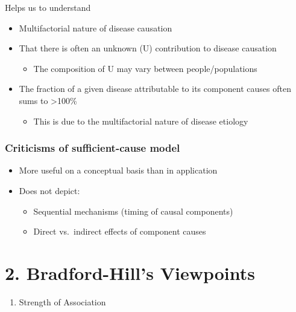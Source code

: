 \documentclass[
]{book}
\providecommand{\tightlist}{%
  \setlength{\itemsep}{0pt}\setlength{\parskip}{0pt}}
\begin{document}
Helps us to understand

\begin{itemize}
\tightlist
\item
  Multifactorial nature of disease causation
\item
  That there is often an unknown (U) contribution to disease causation

  \begin{itemize}
  \tightlist
  \item
    The composition of U may vary between people/populations
  \end{itemize}
\item
  The fraction of a given disease attributable to its component causes often sums to \textgreater100\%

  \begin{itemize}
  \tightlist
  \item
    This is due to the multifactorial nature of disease etiology
  \end{itemize}
\end{itemize}

\hypertarget{criticisms-of-sufficient-cause-model}{%
\subsubsection{Criticisms of sufficient-cause model}\label{criticisms-of-sufficient-cause-model}}

\begin{itemize}
\tightlist
\item
  More useful on a conceptual basis than in application
\item
  Does not depict:

  \begin{itemize}
  \tightlist
  \item
    Sequential mechanisms (timing of causal components)
  \item
    Direct vs.~indirect effects of component causes
  \end{itemize}
\end{itemize}

\hypertarget{bradford-hills-viewpoints}{%
\section{2. Bradford-Hill's Viewpoints}\label{bradford-hills-viewpoints}}

\begin{enumerate}
\def\labelenumi{\arabic{enumi}.}
\tightlist
\item
  Strength of Association
\end{enumerate}
\end{document}
